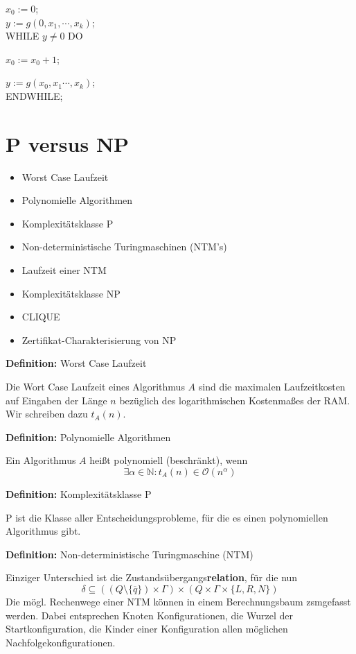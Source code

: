\documentclass[a4paper,graphics,11pt]{article}
\begin{document}
$x_0 := 0$;\\
$y := g(0,x_1,\cdots,x_k)$;\\
WHILE $y\neq 0$ DO\\
\strut\qquad$x_0 := x_0 +1$;\\
\strut\qquad$y := g(x_0,x_1\cdots,x_k)$;\\
ENDWHILE;

\newpage

\section{P versus NP}

\begin{itemize}
    \item Worst Case Laufzeit
    \item Polynomielle Algorithmen
    \item Komplexitätsklasse \textsf{P}
    \item Non-deterministische Turingmaschinen (NTM's)
    \item Laufzeit einer NTM
    \item Komplexitätsklasse \textsf{NP}
    \item CLIQUE
    \item Zertifikat-Charakterisierung von \textsf{NP}
\end{itemize}

\textbf{Definition:} Worst Case Laufzeit

Die Wort Case Laufzeit eines Algorithmus $A$ sind die maximalen Laufzeitkosten
auf Eingaben der Länge $n$ bezüglich des logarithmischen Kostenmaßes der RAM.
Wir schreiben dazu $t_A(n)$.

\strut

\textbf{Definition:} Polynomielle Algorithmen

Ein Algorithmus $A$ heißt polynomiell (beschränkt), wenn
$$
    \exists \alpha \in \mathbb{N}: t_A(n) \in \mathcal{O}(n^\alpha)
$$

\strut

\textbf{Definition:} Komplexitätsklasse \textsf{P}

\textsf{P} ist die Klasse aller Entscheidungsprobleme, für die es einen polynomiellen
Algorithmus gibt.

\strut

\textbf{Definition:} Non-deterministische Turingmaschine (NTM)

Einziger Unterschied ist die Zustandsübergangs\textbf{relation}, für die nun
$$
    \delta \subseteq ((Q\setminus \{\overline{q}\}) \times \Gamma) \times (Q \times \Gamma \times \{L,R,N\})
$$
Die mögl. Rechenwege einer NTM können in einem Berechnungsbaum zsmgefasst werden.
Dabei entsprechen Knoten Konfigurationen, die Wurzel der Startkonfiguration,
die Kinder einer Konfiguration allen möglichen Nachfolgekonfigurationen.
\end{document}
